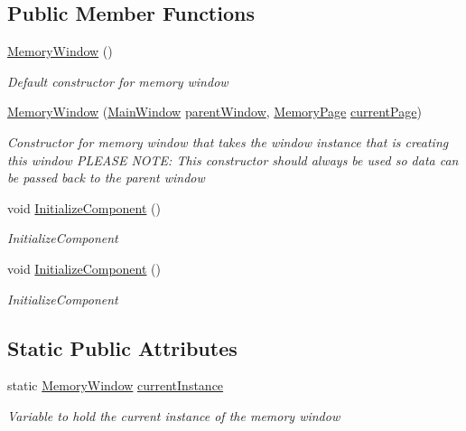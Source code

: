 \subsection*{Public Member Functions}
\begin{DoxyCompactItemize}
\item 
\hyperlink{class_c_p_u___o_s___simulator_1_1_memory_window_a9c72b7aa51f734437bd5e4aa26a230a2}{Memory\+Window} ()
\begin{DoxyCompactList}\small\item\em Default constructor for memory window \end{DoxyCompactList}\item 
\hyperlink{class_c_p_u___o_s___simulator_1_1_memory_window_a7b4208dc517300279d4cf3cd8cac6243}{Memory\+Window} (\hyperlink{class_c_p_u___o_s___simulator_1_1_main_window}{Main\+Window} \hyperlink{class_c_p_u___o_s___simulator_1_1_memory_window_afecdd32e0a0b0215d51f0630367dee3d}{parent\+Window}, \hyperlink{class_c_p_u___o_s___simulator_1_1_memory_1_1_memory_page}{Memory\+Page} \hyperlink{class_c_p_u___o_s___simulator_1_1_memory_window_ae1b974c8b976e19dde1a5491e3fe0e37}{current\+Page})
\begin{DoxyCompactList}\small\item\em Constructor for memory window that takes the window instance that is creating this window P\+L\+E\+A\+S\+E N\+O\+T\+E\+: This constructor should always be used so data can be passed back to the parent window \end{DoxyCompactList}\item 
void \hyperlink{class_c_p_u___o_s___simulator_1_1_memory_window_a40473c2b8ba30a837cf2a122e0978dec}{Initialize\+Component} ()
\begin{DoxyCompactList}\small\item\em Initialize\+Component \end{DoxyCompactList}\item 
void \hyperlink{class_c_p_u___o_s___simulator_1_1_memory_window_a40473c2b8ba30a837cf2a122e0978dec}{Initialize\+Component} ()
\begin{DoxyCompactList}\small\item\em Initialize\+Component \end{DoxyCompactList}\end{DoxyCompactItemize}
\subsection*{Static Public Attributes}
\begin{DoxyCompactItemize}
\item 
static \hyperlink{class_c_p_u___o_s___simulator_1_1_memory_window}{Memory\+Window} \hyperlink{class_c_p_u___o_s___simulator_1_1_memory_window_a870b795e3b919a82888ad608ab24d61a}{current\+Instance}
\begin{DoxyCompactList}\small\item\em Variable to hold the current instance of the memory window \end{DoxyCompactList}\end{DoxyCompactItemize}
